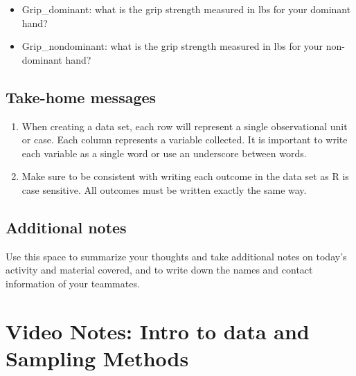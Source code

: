 \documentclass[
]{report}
\providecommand{\tightlist}{%
  \setlength{\itemsep}{0pt}\setlength{\parskip}{0pt}}
\begin{document}
\vspace{0.2in}

\begin{itemize}
\tightlist
\item
  Grip\_dominant: what is the grip strength measured in lbs for your dominant hand?
\end{itemize}

\vspace{0.2in}

\begin{itemize}
\tightlist
\item
  Grip\_nondominant: what is the grip strength measured in lbs for your non-dominant hand?
\end{itemize}

\vspace{0.2in}

\subsection{Take-home messages}\label{take-home-messages}

\begin{enumerate}
\def\labelenumi{\arabic{enumi}.}
\item
  When creating a data set, each row will represent a single observational unit or case. Each column represents a variable collected. It is important to write each variable as a single word or use an underscore between words.
\item
  Make sure to be consistent with writing each outcome in the data set as R is case sensitive. All outcomes must be written exactly the same way.
\end{enumerate}

\subsection{Additional notes}\label{additional-notes}

Use this space to summarize your thoughts and take additional notes on today's activity and material covered, and to write down the names and contact information of your teammates.

\newpage

\section{Video Notes: Intro to data and Sampling Methods}\label{video-notes-intro-to-data-and-sampling-methods}
\end{document}
